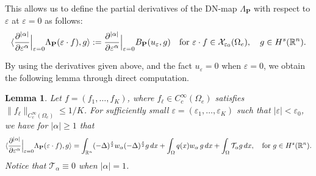 \documentclass [oneside,11pt] {amsart}
\numberwithin{equation}{section}
\newtheorem{lemma}{Lemma}[section]
\newcommand{\R}{\mathbb{R}}
\newcommand{\p}{\partial}
\newcommand{\dx}{\,dx}
\newcommand{\LA}{\langle}
\newcommand{\RA}{\rangle}
\begin{document}
This allows us to define the partial derivatives of the DN-map $\Lambda_\mathbf{P}$ with respect to $\varepsilon$ at $\varepsilon = 0$ as follows:
\begin{align*}
\LA \frac{\p^{|\alpha|}}{\p \varepsilon^\alpha}\Big|_{\varepsilon=0}\Lambda_\mathbf{P}(\varepsilon\cdot f),g \RA 
:= 
\frac{\p^{|\alpha|}}{\p \varepsilon^\alpha}
\Big|_{\varepsilon=0}
B_\mathbf{P}(u_\varepsilon,g)
\quad \hbox{for }\varepsilon\cdot f\in \mathcal{X}_{\varepsilon_0}(\Omega_e),\quad g\in H^s(\R^n).
\end{align*}

By using the derivatives given above, and the fact $u_\varepsilon=0$ when $\varepsilon=0$, we obtain the following lemma through direct computation. 
\begin{lemma}\label{lamma_DN_higher}
Let $f=(f_1,\ldots,f_K)$, where $f_\ell\in C^\infty_c(\Omega_e)$ satisfies $\|f_\ell\|_{C_c^\infty(\Omega_e)}\le 1/K$. For sufficiently small $\varepsilon = (\varepsilon_1,\ldots,\varepsilon_K)$ such that $|\varepsilon|<\varepsilon_0$, we have for $|\alpha|\ge 1$
that
\begin{align*}
\LA \frac{\p^{|\alpha|}}{\p \varepsilon^\alpha} \Big|_{\varepsilon=0}\Lambda_\mathbf{P}(\varepsilon\cdot f),g \RA = \int_{\R^n} (-\Delta)^{\frac{s}{2}}w_\alpha (-\Delta)^{\frac{s}{2}}g \dx + \int_\Omega q(x)w_\alpha\, g \dx+
\int_{\Omega}\mathcal{T}_{\alpha}g \dx,  \quad\hbox{for }g\in H^s(\R^n).
\end{align*}
Notice that $\mathcal T_\alpha \equiv 0$ when $|\alpha|=1$. 
\end{lemma}
\end{document}
